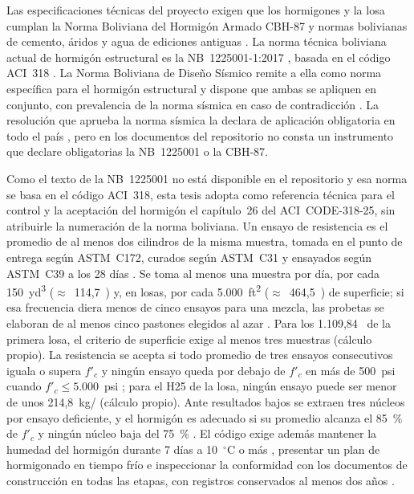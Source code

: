 Las especificaciones técnicas del proyecto exigen que los hormigones y la losa cumplan la Norma Boliviana del Hormigón Armado CBH-87 y normas bolivianas de cemento, áridos y agua de ediciones antiguas \parencite[pp.~1--3]{uatf_et}. La norma técnica boliviana actual de hormigón estructural es la NB~1225001-1:2017 \parencite{nb1225001_2017}, basada en el código ACI~318 \parencite[p.~4]{cocarico2022}. La Norma Boliviana de Diseño Sísmico remite a ella como norma específica para el hormigón estructural y dispone que ambas se apliquen en conjunto, con prevalencia de la norma sísmica en caso de contradicción \parencite[pp.~1, 19]{mopsv2023nbds}. La resolución que aprueba la norma sísmica la declara de aplicación obligatoria en todo el país \parencite[resuelve tercero]{mopsv2023nbds}, pero en los documentos del repositorio no consta un instrumento que declare obligatorias la NB~1225001 o la CBH-87. 

Como el texto de la NB~1225001 no está disponible en el repositorio y esa norma se basa en el código ACI~318, esta tesis adopta como referencia técnica para el control y la aceptación del hormigón el capítulo~26 del ACI~CODE-318-25, sin atribuirle la numeración de la norma boliviana. Un ensayo de resistencia es el promedio de al menos dos cilindros de la misma muestra, tomada en el punto de entrega según ASTM~C172, curados según ASTM~C31 y ensayados según ASTM~C39 a los 28 días \parencite[sección~26.12.1.1]{aci318_2025}. Se toma al menos una muestra por día, por cada 150~yd\textsuperscript{3} ($\approx$~114,7~\mtres{}) y, en losas, por cada 5.000~ft\textsuperscript{2} ($\approx$~464,5~\mdos{}) de superficie; si esa frecuencia diera menos de cinco ensayos para una mezcla, las probetas se elaboran de al menos cinco pastones elegidos al azar \parencite[sección~26.12.2.1]{aci318_2025}. Para los 1.109,84~\mdos{} de la primera losa, el criterio de superficie exige al menos tres muestras (cálculo propio). La resistencia se acepta si todo promedio de tres ensayos consecutivos iguala o supera $f'_c$ y ningún ensayo queda por debajo de $f'_c$ en más de 500~psi cuando $f'_c \leq 5.000$~psi \parencite[sección~26.12.3.1]{aci318_2025}; para el H25 de la losa, ningún ensayo puede ser menor de unos 214,8~kg/\cmdos{} (cálculo propio). Ante resultados bajos se extraen tres núcleos por ensayo deficiente, y el hormigón es adecuado si su promedio alcanza el 85~\% de $f'_c$ y ningún núcleo baja del 75~\% \parencite[sección~26.12.7]{aci318_2025}. El código exige además mantener la humedad del hormigón durante 7 días a 10~$^{\circ}$C o más \parencite[sección~26.5.3.2]{aci318_2025}, presentar un plan de hormigonado en tiempo frío \parencite[sección~26.5.4.2]{aci318_2025} e inspeccionar la conformidad con los documentos de construcción en todas las etapas, con registros conservados al menos dos años \parencite[secciones~26.13.1.2 y 26.13.2.1]{aci318_2025}.

